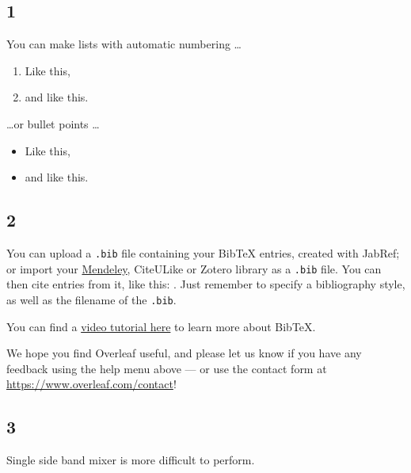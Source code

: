 \documentclass[a4paper]{article}
\begin{document}
\subsection{1}

You can make lists with automatic numbering \dots

\begin{enumerate}
\item Like this,
\item and like this.
\end{enumerate}
\dots or bullet points \dots
\begin{itemize}
\item Like this,
\item and like this.
\end{itemize}

\subsection{2}

You can upload a \verb|.bib| file containing your BibTeX entries, created with JabRef; or import your \href{https://www.overleaf.com/blog/184}{Mendeley}, CiteULike or Zotero library as a \verb|.bib| file. You can then cite entries from it, like this: \cite{greenwade93}. Just remember to specify a bibliography style, as well as the filename of the \verb|.bib|.

You can find a \href{https://www.overleaf.com/help/97-how-to-include-a-bibliography-using-bibtex}{video tutorial here} to learn more about BibTeX.

We hope you find Overleaf useful, and please let us know if you have any feedback using the help menu above --- or use the contact form at \url{https://www.overleaf.com/contact}!

\subsection{3}

Single side band mixer is more difficult to perform.



\end{document}
